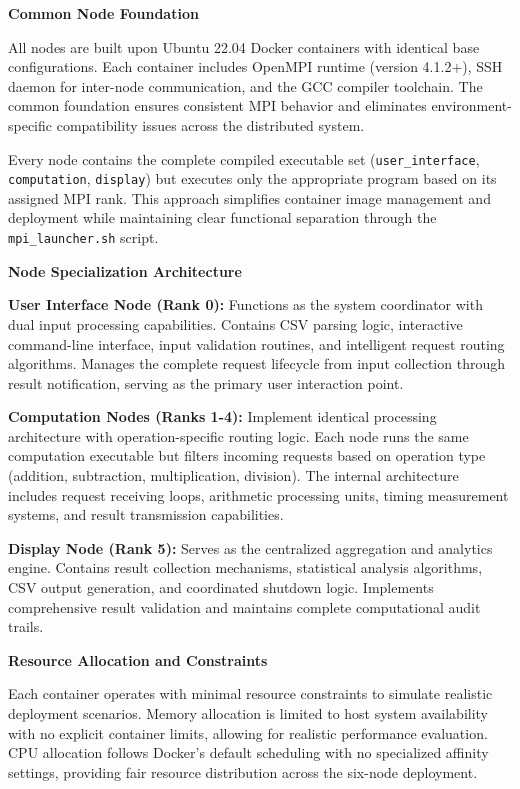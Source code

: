 \documentclass{article}
\begin{document}
\textbf{Common Node Foundation}

All nodes are built upon Ubuntu 22.04 Docker containers with identical base configurations. Each container includes OpenMPI runtime (version 4.1.2+), SSH daemon for inter-node communication, and the GCC compiler toolchain. The common foundation ensures consistent MPI behavior and eliminates environment-specific compatibility issues across the distributed system.

Every node contains the complete compiled executable set (\texttt{user\_interface}, \texttt{computation}, \texttt{display}) but executes only the appropriate program based on its assigned MPI rank. This approach simplifies container image management and deployment while maintaining clear functional separation through the \texttt{mpi\_launcher.sh} script.

\textbf{Node Specialization Architecture}

\textbf{User Interface Node (Rank 0):} Functions as the system coordinator with dual input processing capabilities. Contains CSV parsing logic, interactive command-line interface, input validation routines, and intelligent request routing algorithms. Manages the complete request lifecycle from input collection through result notification, serving as the primary user interaction point.

\textbf{Computation Nodes (Ranks 1-4):} Implement identical processing architecture with operation-specific routing logic. Each node runs the same computation executable but filters incoming requests based on operation type (addition, subtraction, multiplication, division). The internal architecture includes request receiving loops, arithmetic processing units, timing measurement systems, and result transmission capabilities.

\textbf{Display Node (Rank 5):} Serves as the centralized aggregation and analytics engine. Contains result collection mechanisms, statistical analysis algorithms, CSV output generation, and coordinated shutdown logic. Implements comprehensive result validation and maintains complete computational audit trails.

\textbf{Resource Allocation and Constraints}

Each container operates with minimal resource constraints to simulate realistic deployment scenarios. Memory allocation is limited to host system availability with no explicit container limits, allowing for realistic performance evaluation. CPU allocation follows Docker's default scheduling with no specialized affinity settings, providing fair resource distribution across the six-node deployment.
\end{document}
